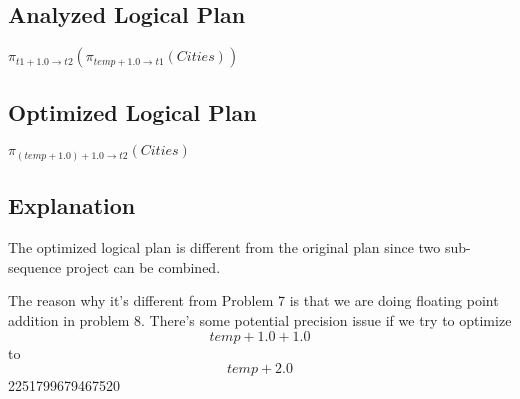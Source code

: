 \documentclass[12pt]{article}
\begin{document}
\subsection*{Analyzed Logical Plan}
$\pi_{t1 + 1.0 \to t2}(\pi_{temp + 1.0 \to t1}(Cities))$

\subsection*{Optimized Logical Plan}
$\pi_{(temp + 1.0) + 1.0 \to t2}(Cities)$

\subsection*{Explanation}
The optimized logical plan is different from the original plan since two sub-sequence project can be combined.

The reason why it's different from Problem 7 is that we are doing floating point addition in problem 8. There's some potential precision issue if we try to optimize $$temp + 1.0 + 1.0$$ to $$temp + 2.0$$
2251799679467520
\end{document}

